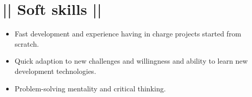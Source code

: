 \section*{|| Soft skills ||}
	\begin{itemize}
		\item Fast development and experience having in charge projects started from scratch.
		\item Quick adaption to new challenges and willingness and ability to learn new development technologies.
		\item Problem-solving mentality and critical thinking.
	\end{itemize}